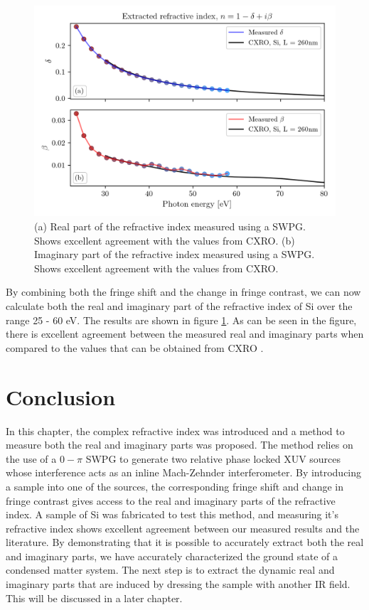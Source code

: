 \begin{figure}
	\centering
	\includegraphics[width=1.0\textwidth]{figures/refractive_index/db_cxro.png}
	\caption{(a) Real part of the refractive index measured using a SWPG.  Shows excellent agreement with the values from CXRO. (b) Imaginary part of the refractive index measured using a SWPG.  Shows excellent agreement with the values from CXRO.}
	\label{fig:measured_delta_beta}
\end{figure}
By combining both the fringe shift and the change in fringe contrast, we can now calculate both the real and imaginary part of the refractive index of Si over the range 25 - 60 eV.  The results are shown in figure \ref{fig:measured_delta_beta}.  As can be seen in the figure, there is excellent agreement between the measured real and imaginary parts when compared to the values that can be obtained from CXRO \cite{henkeXRayInteractionsPhotoabsorption1993}.

\section{Conclusion}
In this chapter, the complex refractive index was introduced and a method to measure both the real and imaginary parts was proposed. The method relies on the use of a $0-\pi$ SWPG to generate two relative phase locked XUV sources whose interference acts as an inline Mach-Zehnder interferometer.  By introducing a sample into one of the sources, the corresponding fringe shift and change in fringe contrast gives access to the real and imaginary parts of the refractive index.  A sample of Si was fabricated to test this method, and measuring it's refractive index shows excellent agreement between our measured results and the literature. By demonstrating that it is possible to accurately extract both the real and imaginary parts, we have accurately characterized the ground state of a condensed matter system.  The next step is to extract the dynamic real and imaginary parts that are induced by dressing the sample with another IR field.  This will be discussed in a later chapter.



